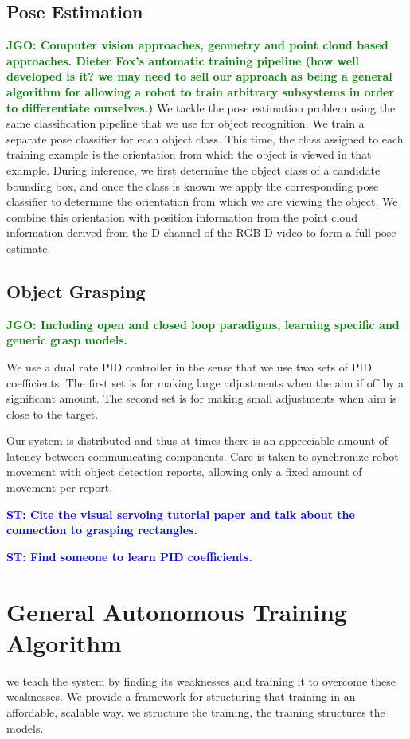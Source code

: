 \documentclass[conference]{IEEEtran}
\newcommand{\stnote}[1]{\textcolor{Blue}{\textbf{ST: #1}}}
\newcommand{\jgonote}[1]{\textcolor{Green}{\textbf{JGO: #1}}}
\begin{document}
\subsection{Pose Estimation}
\jgonote{Computer vision approaches, geometry and point cloud based approaches. Dieter Fox's automatic
training pipeline (how well developed is it? we may need to sell our approach as being a 
general algorithm for allowing a robot to train arbitrary subsystems in order to differentiate 
ourselves.)}
We tackle the pose estimation problem using the same classification pipeline that we use for
object recognition. We train a separate pose classifier for each object class. This time, the class
assigned to each training example is the orientation from which the object is viewed in that example.
During inference, we first determine the object class of a candidate bounding box, and once the class
is known we apply the corresponding pose classifier to determine the orientation from which we
are viewing the object. We combine this orientation with position information from the point cloud
information derived from the D channel of the RGB-D video to form a full pose estimate.

\subsection{Object Grasping}
\jgonote{Including open and closed loop paradigms, learning specific and generic grasp models.}

We use a dual rate PID controller in the sense that we use two sets of PID coefficients. The
first set is for making large adjustments when the aim if off by a significant amount. The
second set is for making small adjustments when aim is close to the target.

Our system is distributed and thus at times there is an appreciable amount of latency between
communicating components. Care is taken to synchronize robot movement with object detection
reports, allowing only a fixed amount of movement per report.

\stnote{Cite the visual servoing tutorial paper and talk about the
  connection to grasping rectangles.}

\stnote{Find someone to learn PID coefficients.}

\section{General Autonomous Training Algorithm}
\label{sec:training}
we teach the system by finding its weaknesses and training it to overcome these 
weaknesses. We provide a framework for structuring that training in an affordable, 
scalable way.  we structure the training, the training structures the models.
\end{document}
